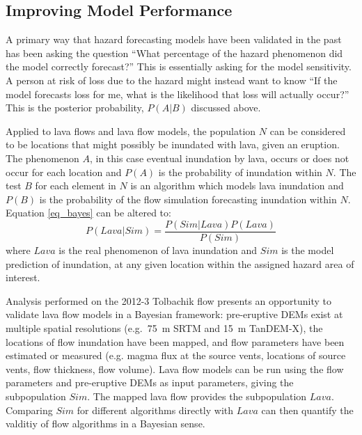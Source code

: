 \documentclass[12pt,letter]{article}
\begin{document}
	\subsection{Improving Model Performance}\label{sec:lava_app}
		A primary way that hazard forecasting models have been validated in the past has been asking the question ``What percentage of the hazard phenomenon did the model correctly forecast?'' This is essentially asking for the model sensitivity. A person at risk of loss due to the hazard might instead want to know ``If the model forecasts loss for me, what is the likelihood that loss will actually occur?'' This is the posterior probability, $P(A|B)$ discussed above.

		Applied to lava flows and lava flow models, the population $N$ can be considered to be locations that might possibly be inundated with lava, given an eruption. The phenomenon $A$, in this case eventual inundation by lava, occurs or does not occur for each location and $P(A)$ is the probability of inundation within $N$. The test $B$ for each element in $N$ is an algorithm which models lava inundation and $P(B)$ is the probability of the flow simulation forecasting inundation within $N$. Equation \ref{eq_bayes} can be altered to:
		\begin{equation}
		P(Lava|Sim)=\frac{P(Sim|Lava)P(Lava)}{P(Sim)}\label{eq_lavabayes}
		\end{equation}
		where $Lava$ is the real phenomenon of lava inundation and $Sim$ is the model prediction of inundation, at any given location within the assigned hazard area of interest.

		Analysis performed on the 2012-3 Tolbachik flow presents an opportunity to validate lava flow models in a Bayesian framework: pre-eruptive DEMs exist at multiple spatial resolutions (e.g.~75~m SRTM and 15~m TanDEM-X), the locations of flow inundation have been mapped, and flow parameters have been estimated or measured (e.g. magma flux at the source vents, locations of source vents, flow thickness, flow volume). Lava flow models can be run using the flow parameters and pre-eruptive DEMs as input parameters, giving the subpopulation $Sim$. The mapped lava flow provides the subpopulation $Lava$. Comparing $Sim$ for different algorithms directly with $Lava$ can then quantify the valditiy of flow algorithms in a Bayesian sense.
\end{document}
